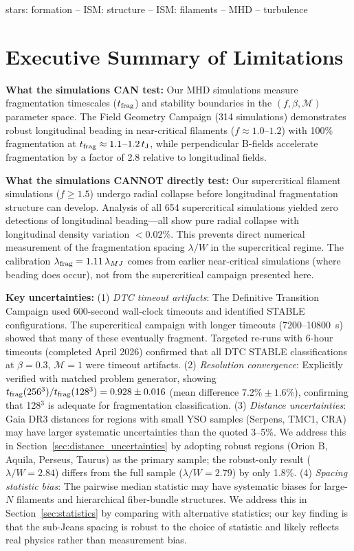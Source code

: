 \documentclass[twoside,twocolumn]{mnras}
\begin{document}
\begin{keywords}
stars: formation -- ISM: structure -- ISM: filaments -- MHD -- turbulence
\end{keywords}

\section*{Executive Summary of Limitations}

\textbf{What the simulations CAN test:} Our MHD simulations measure fragmentation timescales ($t_{\rm frag}$) and stability boundaries in the $(f, \beta, \mathcal{M})$ parameter space. The Field Geometry Campaign (314 simulations) demonstrates robust longitudinal beading in near-critical filaments ($f \approx 1.0$--$1.2$) with 100\% fragmentation at $t_{\rm frag} \approx 1.1$--$1.2\,t_{\rm J}$, while perpendicular B-fields accelerate fragmentation by a factor of 2.8 relative to longitudinal fields.

\textbf{What the simulations CANNOT directly test:} Our supercritical filament simulations ($f \geq 1.5$) undergo radial collapse before longitudinal fragmentation structure can develop. Analysis of all 654 supercritical simulations yielded zero detections of longitudinal beading---all show pure radial collapse with longitudinal density variation $<0.02\%$. This prevents direct numerical measurement of the fragmentation spacing $\lambda/W$ in the supercritical regime. The calibration $\lambda_{\rm frag} = 1.11\,\lambda_{MJ}$ comes from earlier near-critical simulations (where beading does occur), not from the supercritical campaign presented here.

\textbf{Key uncertainties:} (1) \textit{DTC timeout artifacts}: The Definitive Transition Campaign used 600-second wall-clock timeouts and identified STABLE configurations. The supercritical campaign with longer timeouts (7200--10800~s) showed that many of these eventually fragment. Targeted re-runs with 6-hour timeouts (completed April 2026) confirmed that all DTC STABLE classifications at $\beta = 0.3$, $\mathcal{M} = 1$ were timeout artifacts. (2) \textit{Resolution convergence}: Explicitly verified with matched problem generator, showing $t_{\rm frag}(256^3)/t_{\rm frag}(128^3) = 0.928 \pm 0.016$ (mean difference $7.2\% \pm 1.6\%$), confirming that 128$^3$ is adequate for fragmentation classification. (3) \textit{Distance uncertainties}: Gaia DR3 distances for regions with small YSO samples (Serpens, TMC1, CRA) may have larger systematic uncertainties than the quoted 3--5\%. We address this in Section~\ref{sec:distance_uncertainties} by adopting robust regions (Orion B, Aquila, Perseus, Taurus) as the primary sample; the robust-only result ($\lambda/W = 2.84$) differs from the full sample ($\lambda/W = 2.79$) by only 1.8\%. (4) \textit{Spacing statistic bias}: The pairwise median statistic may have systematic biases for large-$N$ filaments and hierarchical fiber-bundle structures. We address this in Section~\ref{sec:statistics} by comparing with alternative statistics; our key finding is that the sub-Jeans spacing is robust to the choice of statistic and likely reflects real physics rather than measurement bias.
\end{document}
